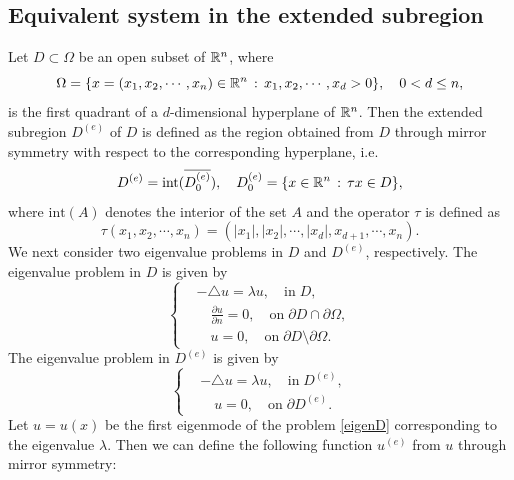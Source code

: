 \documentclass[a4paper,11pt]{article}
\begin{document}
\begin{appendices}
\section{Equivalent system in the extended subregion}\label{appD}
Let $D \subset \Omega$ be an open subset of $\mathbb{R}^n$, where
\begin{equation*}
\Omega = \{x = (x_1, x_2, \cdots, x_n) \in \mathbb{R}^n \, : \, x_1, x_2, \cdots, x_d > 0\}, \quad 0 < d \leq n,
\end{equation*}
is the first quadrant of a $d$-dimensional hyperplane of $\mathbb{R}^n$. Then the extended subregion $D^{(e)}$ of $D$ is defined as the region obtained from $D$ through mirror symmetry with respect to the corresponding hyperplane, i.e.
\begin{equation*}
D^{(e)} = \mathrm{int}(\overline{D^{(e)}_0}), \quad D^{(e)}_0 = \{x \in \mathbb{R}^n \, : \, \tau x \in D \},
\end{equation*}
where $\mathrm{int}(A)$ denotes the interior of the set $A$ and the operator $\tau$ is defined as
\begin{equation*}
\tau (x_1, x_2, \cdots, x_n) = (|x_1|, |x_2|, \cdots, |x_d|, x_{d+1}, \cdots, x_n).
\end{equation*}
We next consider two eigenvalue problems in $D$ and $D^{(e)}$, respectively. The eigenvalue problem in $D$ is given by
\begin{equation}\label{eigenD}
\left\{
\begin{split}
& -\triangle u = \lambda u, \quad \textrm{in} \; D, \\
& \quad \frac{\partial u}{\partial n} = 0, \quad \textrm{on} \; \partial D \cap \partial \Omega,\\
& \quad u = 0, \quad \textrm{on} \; \partial D \setminus \partial \Omega.
\end{split}
\right.
\end{equation}
The eigenvalue problem in $D^{(e)}$ is given by
\begin{equation}\label{eigenDe}
\left\{
\begin{split}
& -\triangle u = \lambda u, \quad \textrm{in} \; D^{(e)}, \\
& \quad u = 0, \quad \textrm{on} \; \partial D^{(e)}.
\end{split}
\right.
\end{equation}
Let $u = u(x)$ be the first eigenmode of the problem \eqref{eigenD} corresponding to the eigenvalue $\lambda$. Then we can define the following function $u^{(e)}$ from $u$ through mirror symmetry:
\begin{gather*}

\end{gather*}
\end{appendices}
\end{document}
